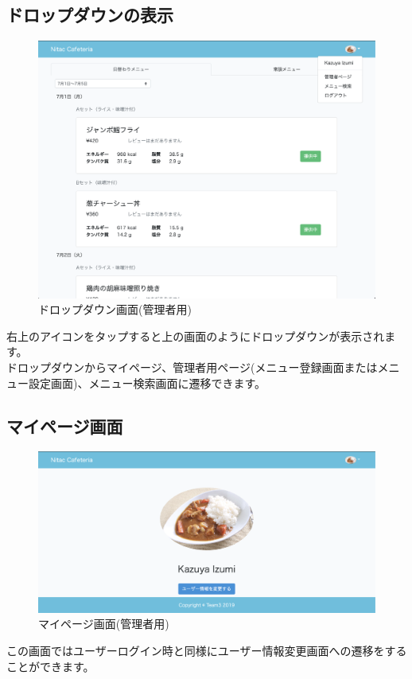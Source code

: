 \documentclass[a4paper]{jsarticle}
\begin{document}
\subsection{ドロップダウンの表示}
\begin{figure}[htbp]
	\centering
		\caption{ドロップダウン画面(管理者用)}
		\includegraphics[scale = 0.225]{image/dropdown_admin.png}
	\end{figure}
	右上のアイコンをタップすると上の画面のようにドロップダウンが表示されます。\\
	ドロップダウンからマイページ、管理者用ページ(メニュー登録画面またはメニュー設定画面)、メニュー検索画面に遷移できます。\\
\newpage
\subsection{マイページ画面}
\begin{figure}[htbp]
	\centering
		\caption{マイページ画面(管理者用)}
		\includegraphics[scale = 0.225]{image/mypage_admin.png}
	\end{figure}
	この画面ではユーザーログイン時と同様にユーザー情報変更画面への遷移をすることができます。
\end{document}
